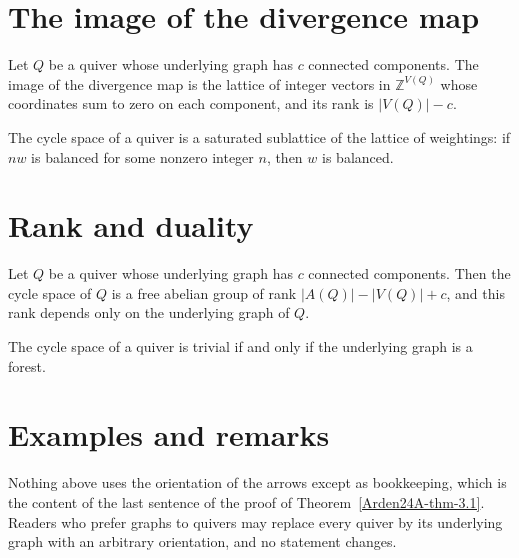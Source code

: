 \section{The image of the divergence map}\label{Arden24A-sec-2}

\begin{proposition}\label{Arden24A-prop-2.1}
\label{Arden24A-prop:image}
Let $Q$ be a quiver whose underlying graph has $c$ connected components. The image of the divergence map is the lattice of integer vectors in $\mathbb{Z}^{V(Q)}$ whose coordinates sum to zero on each component, and its rank is $|V(Q)| - c$.
\end{proposition}

\begin{lemma}\label{Arden24A-lem-2.2}
\label{Arden24A-lem:saturated}
The cycle space of a quiver is a saturated sublattice of the lattice of weightings: if $nw$ is balanced for some nonzero integer $n$, then $w$ is balanced.
\end{lemma}

\section{Rank and duality}\label{Arden24A-sec-3}

\begin{theorem}\label{Arden24A-thm-3.1}
\label{Arden24A-thm:rank}
Let $Q$ be a quiver whose underlying graph has $c$ connected components. Then the cycle space of $Q$ is a free abelian group of rank $|A(Q)| - |V(Q)| + c$, and this rank depends only on the underlying graph of $Q$.
\end{theorem}

\begin{corollary}\label{Arden24A-cor-3.2}
\label{Arden24A-cor:forest}
The cycle space of a quiver is trivial if and only if the underlying graph is a forest.
\end{corollary}

\section{Examples and remarks}\label{Arden24A-sec-4}

\begin{remark}\label{Arden24A-rem-4.1}
\label{Arden24A-rem:orientation}
Nothing above uses the orientation of the arrows except as bookkeeping, which is the content of the last sentence of the proof of Theorem~\ref{Arden24A-thm-3.1}. Readers who prefer graphs to quivers may replace every quiver by its underlying graph with an arbitrary orientation, and no statement changes.
\end{remark}


